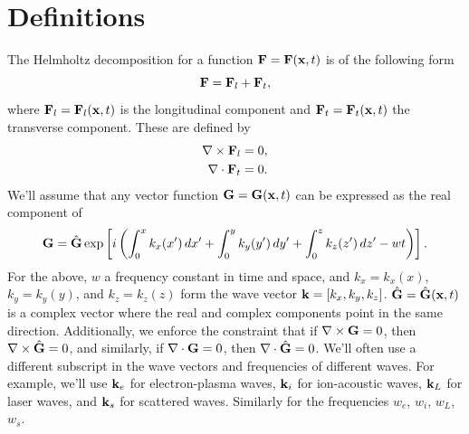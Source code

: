 \documentclass[a4paper,11pt]{report}
\begin{document}
\section{Definitions}
The Helmholtz decomposition for a function $\mathbf{F} = \mathbf{F}(\mathbf{x},t)$ is of the following form
\begin{equation}
    \mathbf{F} = \mathbf{F}_l + \mathbf{F}_t,
\end{equation}
where $\mathbf{F}_l = \mathbf{F}_l(\mathbf{x},t)$ is the longitudinal component and $\mathbf{F}_t = \mathbf{F}_t(\mathbf{x},t)$ the transverse component. These are defined by
\begin{align}
    \nabla \times \mathbf{F}_l &= 0, \label{eq:ltw_plasma_long_def}\\
    \nabla \cdot \mathbf{F}_t &= 0. \label{eq:ltw_plasma_tran_def}
\end{align}
We'll assume that any vector function $\mathbf{G} = \mathbf{G}(\mathbf{x},t)$ can be expressed as the real component of
\begin{equation}
    \label{eq:em_more_general_wave_form}
    \mathbf{G} = \hat{\mathbf{G}} \exp \left [ i \left ( \int_0^x k_x(x') \, dx' + \int_0^y k_y(y') \, dy' + \int_0^z k_z(z') \, dz'  - wt \right ) \right ].
\end{equation}
For the above, $w$ a frequency constant in time and space, and $k_x = k_x(x)$, $k_y = k_y(y)$, and $k_z = k_z(z)$ form the wave vector $\mathbf{k} = [k_x, k_y, k_z]$. $\hat{\mathbf{G}} = \hat{\mathbf{G}}(\mathbf{x},t)$ is a complex vector where the real and complex components point in the same direction. Additionally, we enforce the constraint that if $\nabla \times \mathbf{G} = 0$, then $\nabla \times \hat{\mathbf{G}} = 0$, and similarly, if $\nabla \cdot \mathbf{G} = 0$, then $\nabla \cdot \hat{\mathbf{G}} = 0$. We'll often use a different subscript in the wave vectors and frequencies of different waves. For example, we'll use $\mathbf{k}_e$ for electron-plasma waves, $\mathbf{k}_i$ for ion-acoustic waves, $\mathbf{k}_L$ for laser waves, and $\mathbf{k}_s$ for scattered waves. Similarly for the frequencies $w_e$, $w_i$, $w_L$, $w_s$.
\end{document}
